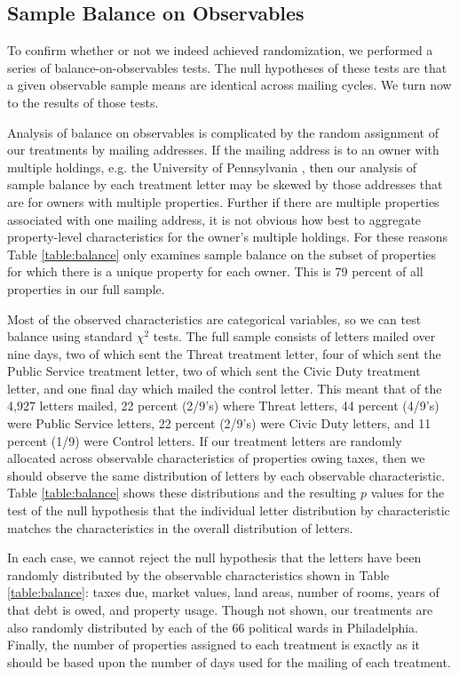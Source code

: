 \documentclass[12pt,titlepage]{article}
\begin{document}
\subsection{Sample Balance on Observables}

To confirm whether or not we indeed achieved randomization, we
performed a series of balance-on-observables tests. The null
hypotheses of these tests are that a given observable sample means are
identical across mailing cycles. We turn now to the results of those
tests.

Analysis of balance on observables is complicated by the random
assignment of our treatments by mailing addresses.  If the mailing
address is to an owner with multiple holdings, e.g. the University
of Pennsylvania , then our analysis of sample balance by each
treatment letter may be skewed by those addresses that are for owners
with multiple properties.  Further if there are multiple properties
associated with one mailing address, it is not obvious how best to
aggregate property-level characteristics for the owner's multiple
holdings.  For these reasons Table \ref{table:balance} only examines sample
balance on the subset of properties for which there is a unique
property for each owner.  This is 79 percent of all properties in our
full sample.
  
Most of the observed characteristics are categorical variables, so we
can test balance using standard $\chi^2$ tests. The full sample
consists of letters mailed over nine days, two of which sent the
Threat treatment letter, four of which sent the Public Service
treatment letter, two of which sent the Civic Duty treatment letter,
and one final day which mailed the control letter.  This meant that of
the 4,927 letters mailed, 22 percent (2/9's) where Threat letters, 44
percent (4/9's) were Public Service letters, 22 percent (2/9's) were
Civic Duty letters, and 11 percent (1/9) were Control letters.  If our
treatment letters are randomly allocated across observable
characteristics of properties owing taxes, then we should observe the
same distribution of letters by each observable characteristic.  Table
\ref{table:balance} shows these distributions and the resulting $p$
values for the test of the null hypothesis that the individual letter
distribution by characteristic matches the characteristics in the
overall distribution of letters.

In each case, we cannot reject the null hypothesis that the letters
have been randomly distributed by the observable characteristics shown
in Table \ref{table:balance}: taxes due, market values, land areas, number
of rooms, years of that debt is owed, and property usage.  Though not
shown, our treatments are also randomly distributed by each of the 66
political wards in Philadelphia.  Finally, the number of properties
assigned to each treatment is exactly as it should be based upon the
number of days used for the mailing of each treatment.
\end{document}
